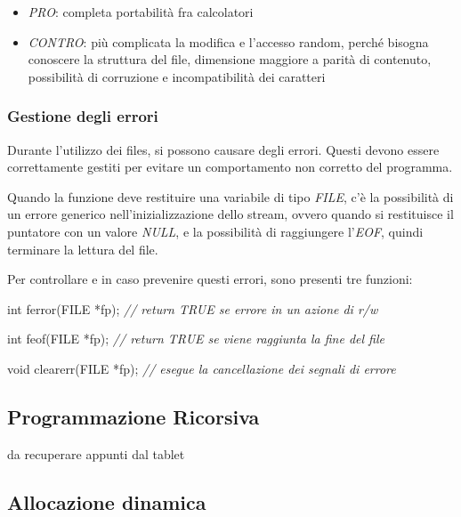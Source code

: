 \documentclass[
]{article}
\newenvironment{Shaded}{}{}
\newcommand{\CommentTok}[1]{\textcolor[rgb]{0.38,0.63,0.69}{\textit{#1}}}
\newcommand{\DataTypeTok}[1]{\textcolor[rgb]{0.56,0.13,0.00}{#1}}
\newcommand{\NormalTok}[1]{#1}
\begin{document}
\begin{itemize}
\item
  \emph{PRO}: completa portabilità fra calcolatori
\item
  \emph{CONTRO}: più complicata la modifica e l'accesso random, perché
  bisogna conoscere la struttura del file, dimensione maggiore a parità
  di contenuto, possibilità di corruzione e incompatibilità dei
  caratteri
\end{itemize}

\hypertarget{header-n1081}{%
\subsubsection{Gestione degli errori}\label{header-n1081}}

Durante l'utilizzo dei files, si possono causare degli errori. Questi
devono essere correttamente gestiti per evitare un comportamento non
corretto del programma.

Quando la funzione deve restituire una variabile di tipo \emph{FILE},
c'è la possibilità di un errore generico nell'inizializzazione dello
stream, ovvero quando si restituisce il puntatore con un valore
\emph{NULL}, e la possibilità di raggiungere l'\emph{EOF}, quindi
terminare la lettura del file.

Per controllare e in caso prevenire questi errori, sono presenti tre
funzioni:

\begin{Shaded}
\begin{Highlighting}[]
\DataTypeTok{int}\NormalTok{ ferror(}\DataTypeTok{FILE}\NormalTok{ *fp); 	  }\CommentTok{// return TRUE se errore in un azione di r/w}

\DataTypeTok{int}\NormalTok{ feof(}\DataTypeTok{FILE}\NormalTok{ *fp); 	 }\CommentTok{// return TRUE se viene raggiunta la fine del file}

\DataTypeTok{void}\NormalTok{ clearerr(}\DataTypeTok{FILE}\NormalTok{ *fp); }\CommentTok{// esegue la cancellazione dei segnali di errore}
\end{Highlighting}
\end{Shaded}

\hypertarget{header-n1087}{%
\subsection{Programmazione Ricorsiva}\label{header-n1087}}

da recuperare appunti dal tablet

\hypertarget{header-n1090}{%
\subsection{Allocazione dinamica}\label{header-n1090}}
\end{document}
